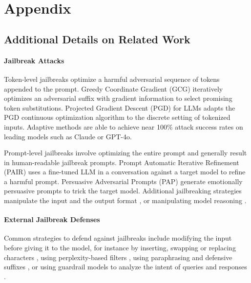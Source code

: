 \documentclass[11pt]{article}
\begin{document}


\appendix

\section{Appendix}
\label{sec:appendix}

\subsection{Additional Details on Related Work}
\label{app:details_related}

\paragraph{Jailbreak Attacks}
Token-level jailbreaks optimize a harmful adversarial sequence of tokens appended to the prompt.
Greedy Coordinate Gradient (GCG) \citep{zou2023universaltransferableadversarialattacks} iteratively optimizes an adversarial suffix with gradient information to select promising token substitutions. Projected Gradient Descent (PGD) for LLMs \citep{geisler2025attackinglargelanguagemodels} adapts the PGD continuous optimization algorithm to the discrete setting of tokenized inputs.
Adaptive methods \citep{andriushchenko2025jailbreakingleadingsafetyalignedllms}
are able to achieve near 100\% attack success rates on leading models such as Claude or GPT-4o.

Prompt-level jailbreaks involve optimizing the entire prompt and generally result in human-readable jailbreak prompts. Prompt Automatic Iterative Refinement (PAIR) \citep{chao2024jailbreakingblackboxlarge} uses a fine-tuned LLM in a conversation against a target model to refine a harmful prompt.
Persuasive Adversarial Prompts (PAP) \citep{zeng2024johnnypersuadellmsjailbreak} generate emotionally persuasive prompts to trick the target model. Additional jailbreaking strategies manipulate the input and the output format \citep{huang2024endlessjailbreaksbijectionlearning, yuan2024gpt4smartsafestealthy}, or manipulating model reasoning \citep{wu2024knowimsayingjailbreak, ramesh2024gpt4jailbreaksnearperfectsuccess}.

 

\paragraph{External Jailbreak Defenses}
Common strategies to defend against jailbreaks include modifying the input before giving it to the model, for instance by inserting, swapping or replacing characters \citep{robey2024smoothllmdefendinglargelanguage}, using perplexity-based filters \citep{jain2023baselinedefensesadversarialattacks}, using paraphrasing and defensive suffixes \citep{yuan2024rigorllmresilientguardrailslarge}, or using guardrail models to analyze the intent of queries and responses \citep{zeng2024autodefensemultiagentllmdefense}.
\end{document}
